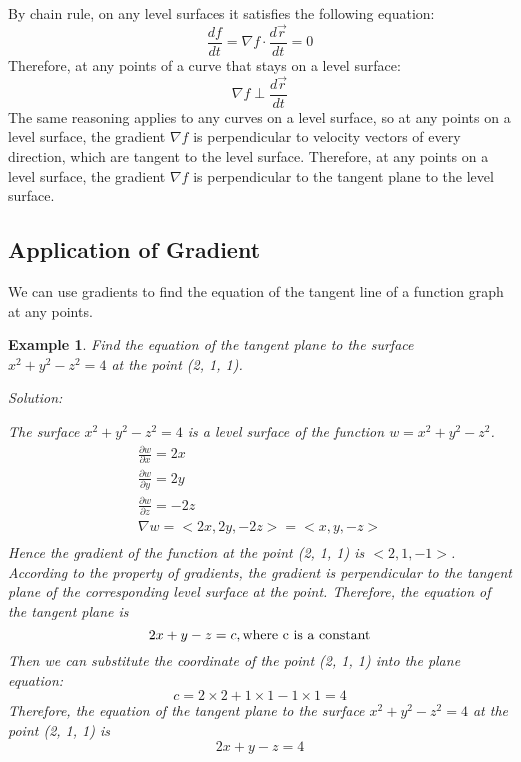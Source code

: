 \documentclass{article}
\newtheorem{example}{Example}
\begin{document}
By chain rule, on any level surfaces it satisfies the following equation:
\begin{equation*}
  \frac{df}{dt} = \nabla f \cdot \frac{d\vec{r}}{dt} = 0
\end{equation*}
Therefore, at any points of a curve that stays on a level surface:
\begin{equation*}
  \nabla f \perp \frac{d\vec{r}}{dt}
\end{equation*}
The same reasoning applies to any curves on a level surface, so at any points on 
a level surface, the gradient $\nabla f$ is perpendicular to velocity vectors of 
every direction, which are tangent to the level surface. Therefore, at any 
points on a level surface, the gradient $\nabla f$ is perpendicular to the 
tangent plane to the level surface.

\subsection{Application of Gradient}

We can use gradients to find the equation of the tangent line of a function 
graph at any points.

\begin{example}
  Find the equation of the tangent plane to the surface $x^2 + y^2 - z^2 = 4$ at 
  the point (2, 1, 1).

  Solution:

  The surface $x^2 + y^2 - z^2 = 4$ is a level surface of the function 
  $w = x^2 + y^2 - z^2$.
  \begin{gather*}
    \frac{\partial w}{\partial x} = 2x \\
    \frac{\partial w}{\partial y} = 2y \\
    \frac{\partial w}{\partial z} = -2z \\
    \nabla w = <2x, 2y, -2z> = <x, y, -z> \\
  \end{gather*}
  Hence the gradient of the function at the point (2, 1, 1) is $<2, 1, -1>$. 
  According to the property of gradients, the gradient is perpendicular to the 
  tangent plane of the corresponding level surface at the point. Therefore, the 
  equation of the tangent plane is 
  \[ 2x + y - z = c, \textnormal{where c is a constant} \]
  Then we can substitute the coordinate of the point (2, 1, 1) into the plane 
  equation:
  \[ c = 2 \times 2 + 1 \times 1 - 1 \times 1 = 4 \]
  Therefore, the equation of the tangent plane to the surface 
  $x^2 + y^2 - z^2 = 4$ at the point (2, 1, 1) is
  \[ 2x + y - z = 4 \]
\end{example}
\end{document}

